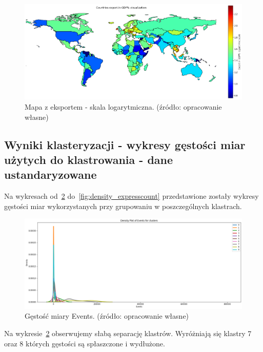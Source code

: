 \documentclass[11pt]{report}
\begin{document}
    \begin{figure}[!htp]
        \centering
        \includegraphics[width=\linewidth]{fig/CLUST/export2015.png}
        \caption{Mapa z eksportem - skala logarytmiczna. (źródło: opracowanie własne)}
        \label{fig:clustExport2015_log}
    \end{figure}

    \subsection{Wyniki klasteryzacji - wykresy gęstości miar użytych do klastrowania - dane ustandaryzowane}
    Na wykresach od~\ref{fig:density_events} do~\ref{fig:density_expresscount} przedstawione zostały wykresy gęstości miar wykorzystanych przy grupowaniu w poszczególnych klastrach.

    \begin{figure}[!htp]
        \centering
        \includegraphics[width=\linewidth]{fig/CLUST/density_Events.png}
        \caption{Gęstość miary Events. (źródło: opracowanie własne)}
        \label{fig:density_events}
    \end{figure}

    Na wykresie~\ref{fig:density_events} obserwujemy słabą separację klastrów.
    Wyróżniają się klastry 7 oraz 8 których gęstości są spłaszczone i wydłużone.
\end{document}
